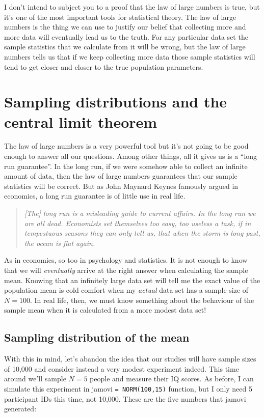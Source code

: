 I don't intend to subject you to a proof that the law of large numbers is true, but it's one of the most important tools for statistical theory. The law of large numbers is the thing we can use to justify our belief that collecting more and more data will eventually lead us to the truth. For any particular data set the sample statistics that we calculate from it will be wrong, but the law of large numbers tells us that if we keep collecting more data those sample statistics will tend to get closer and closer to the true population parameters.


\section{Sampling distributions and the central limit theorem~\label{sec:samplesandclt}}

The law of large numbers is a very powerful tool but it's not going to be good enough to answer all our questions. Among other things, all it gives us is a ``long run guarantee''. In the long run, if we were somehow able to collect an infinite amount of data, then the law of large numbers guarantees that our sample statistics will be correct. But as John Maynard Keynes famously argued in economics, a long run guarantee is of little use in real life.
\begin{quote}
{\it [The] long run is a misleading guide to current affairs. In the long run we are all dead. Economists set themselves too easy, too useless a task, if in tempestuous seasons they can only tell us, that when the storm is long past, the ocean is flat again.}
\parencite[p.~80]{Keynes1923}
\end{quote}
As in economics, so too in psychology and statistics. It is not enough to know that we will {\it eventually} arrive at the right answer when calculating the sample mean. Knowing that an infinitely large data set will tell me the exact value of the population mean is cold comfort when my {\it actual} data set has a sample size of $N=100$. In real life, then, we must know something about the behaviour of the sample mean when it is calculated from a more modest data set!

\subsection{Sampling distribution of the mean~\label{sec:samplingdists}}

With this in mind, let's abandon the idea that our studies will have sample sizes of 10,000 and consider instead a very modest experiment indeed. This time around we'll sample $N=5$ people and measure their IQ scores. As before, I can simulate this experiment in jamovi \texttt{= NORM(100,15)} function, but I only need 5 participant IDs this time, not 10,000. These are the five numbers that jamovi generated:

